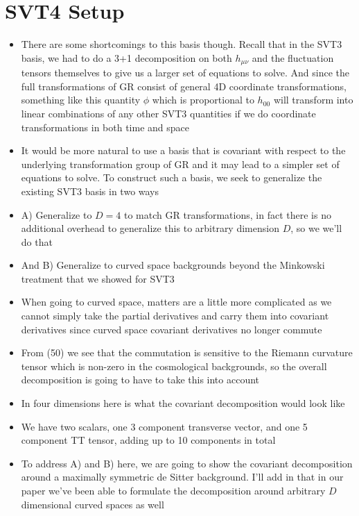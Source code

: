 \documentclass[10pt,letterpaper]{article}
\numberwithin{equation}{section}
\begin{document}

\section{SVT4 Setup}
\begin{itemize}
	\item There are some shortcomings to this basis though. Recall that in the SVT3 basis, we had to do a 3+1 decomposition on both $h_{\mu\nu}$ and the fluctuation tensors themselves to give us a larger set of equations to solve. And since the full transformations of GR consist of general 4D coordinate transformations, something like this quantity $\phi$ which is proportional to $h_{00}$ will transform into linear combinations of any other SVT3 quantities if we do coordinate transformations in both time and space
	\item It would be more natural to use a basis that is covariant with respect to the underlying transformation group of GR and it may lead to a simpler set of equations to solve. To construct such a basis, we seek to generalize the existing SVT3 basis in two ways
	\item A) Generalize to $D=4$ to match GR transformations, in fact there is no additional overhead to generalize this to arbitrary dimension $D$, so we we'll do that \vspace{1mm}
	\item And B) Generalize to curved space backgrounds beyond the Minkowski treatment that we showed for SVT3
	\item When going to curved space, matters are a little more complicated as we cannot simply take the partial derivatives and carry them into covariant derivatives since curved space covariant derivatives no longer commute
	\item From (50) we see that the commutation is sensitive to the Riemann curvature tensor which is non-zero in the cosmological backgrounds, so the overall decomposition is going to have to take this into account
	\item In four dimensions here is what the covariant decomposition would look like
	\item We have two scalars, one 3 component transverse vector, and one 5 component TT tensor, adding up to 10 components in total
	\item To address A) and B) here, we are going to show the covariant decomposition around a maximally symmetric de Sitter background. I'll add in that in our paper we've been able to formulate the decomposition around arbitrary $D$ dimensional curved spaces as well 
\end{itemize}
\end{document}

